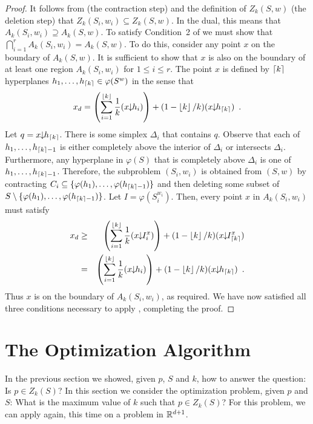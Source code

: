 \documentclass[lotsofwhite]{patmorin}
\newcommand{\drop}{\!\!\downarrow\!\!}
\newcommand{\dual}{\varphi}
\begin{document}
\begin{proof}
It follows from  (the contraction step) 
and the definition of $Z_k(S,w)$ (the deletion step)
that $Z_k(S_i,{w_i})\subseteq Z_k(S,w)$.  In the dual, this means that
$A_k(S_i,{w_i})\supseteq A_k(S,w)$.  To satisfy Condition~2 of
 we must
show that $\bigcap_{i=1}^r A_k(S_i,{w_i}) = A_k(S,w)$.  To do this,
consider any point $x$ on the boundary of $A_k(S,w)$.  It is
sufficient to show that $x$ is also on the boundary of at least one
region $A_k(S_i,{w_i})$ for $1\le i\le r$.  The point $x$ is defined
by $\left\lceil k \right\rceil$ hyperplanes $h_1,\ldots,h_{\ceil{k}}\in\dual(S^w)$ in
the sense that 
\[
   x_d=\left(\sum_{i=1}^{\floor{k}} \frac{1}{k}(x\drop h_i)\right) 
       + (1-\floor{k}/k)(x\drop h_{\ceil{k}}) \enspace .
\]
Let $q=x\drop h_{\ceil{k}}$.  There
is some simplex $\Delta_i$ that contains $q$.  Observe that
each of $h_1,\ldots,h_{\left\lceil k \right\rceil-1}$ is either completely above
the interior of $\Delta_i$ or intersects $\Delta_i$.  Furthermore, 
any hyperplane in
$\dual(S)$ that is completely above $\Delta_i$ is one of
$h_1,\ldots,h_{\left\lceil k \right\rceil-1}$.  Therefore, the subproblem $(S_i,w_i)$
is obtained from $(S,w)$ by contracting
$C_i\subseteq\{\dual(h_1),\ldots,\dual(h_{\ceil{k}-1})\}$ and then deleting 
some subset of
$S\setminus\{\dual(h_1),\ldots,\dual(h_{\ceil{k}-1})\}$.  Let
$I=\dual(S_i^{w_i})$.  Then, every point $x$ in $A_k(S_i,w_i)$ must
satisfy
\begin{eqnarray*}
  x_d & \ge & \left(\sum_{i=1}^{\floor{k}} \frac{1}{k}(x\drop I_i^x)\right) 
       + (1-\floor{k}/k)(x\drop I_{\ceil{k}}^x) \\
   & = & \left(\sum_{i=1}^{\floor{k}} \frac{1}{k}(x\drop h_i)\right) 
       + (1-\floor{k}/k)(x\drop h_{\ceil{k}}) \enspace .
\end{eqnarray*}
Thus $x$ is on the boundary of $A_k(S_i,w_i)$, as required.  We have
now satisfied all three conditions necessary to apply ,
completing the proof.
\end{proof}

\section{The Optimization Algorithm}

In the previous section we showed, given $p$, $S$ and $k$, how to
answer the question:  Is $p\in Z_k(S)$?  In this section we consider
the optimization problem, given $p$ and $S$: What is the maximum value
of $k$ such that $p\in Z_k(S)$?  For this problem, we can apply
 again, this time on a problem in $\mathbb{R}^{d+1}$.
\end{document}
